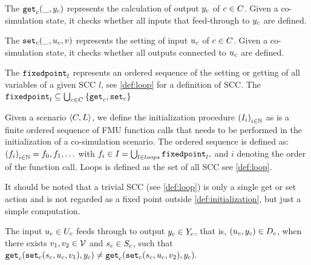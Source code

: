 \begin{definition}\label{def:getout}
The $\mathtt{get}_{c}(\_, y_{c})$ represents the calculation of output $y_{c}$ of $c \in C$. Given a co-simulation state, it checks whether all inputs that feed-through to $y_{c}$ are defined.
\end{definition}

\begin{definition}\label{def:setin}
The $\mathtt{set}_{c}(\_, u_{c}, v)$ represents the setting of input $u_{c}$  of $c \in C$. Given a co-simulation state, it checks whether all outputs connected to $u_{c}$ are defined.
\end{definition}

\begin{definition}\label{def:fixedpoint}
The $\mathtt{fixedpoint}_{l}$ represents an ordered sequence of the setting or getting of all variables of a given SCC $l$, see \cref{def:loop} for a definition of SCC.
The $\mathtt{fixedpoint}_{l} \subseteq \bigcup_{c \in C}  \left\{ \mathtt{get}_{c},\mathtt{set}_{c} \right\}$ 
\end{definition}


\begin{definition}[Initialization]\label{def:initialization}
  Given a scenario $ \left\langle C, L \right\rangle $, we define the initialization procedure $ \left( I_i \right)_{i \in \mathbb{N}}$ as is a finite ordered sequence of FMU function calls that needs to be performed in the initialization of a co-simulation scenario. The ordered sequence is defined as: $ \left( f_i \right)_{i \in \mathbb{N}} = f_0, f_1, \ldots$ with
  $f_i \in I_{} = \bigcup_{l \in loops} \mathtt{fixedpoint}_{l},$
  and $i$ denoting the order of the function call.
  Loops is defined as the set of all SCC see \cref{def:loop}.
\end{definition}

It should be noted that a trivial SCC (see \cref{def:loop}) is only a single get or set action and is not regarded as a fixed point outside \cref{def:initialization}, but just a simple computation.

\begin{definition}\label{def:feedthrough}
  The input $u_{c} \in U_{c}$ feeds through to output $y_{c} \in Y_{c}$, that is, $(u_{c},y_{c}) \in D_{c}$, when there exists $v_1, v_2 \in \mathcal{V}$ and $s_{c} \in S_{c}$, such that
  $
  \mathtt{get}_{c} (\mathtt{set}_{c}(s_{c}, u_{c}, v_1), y_{c}) \neq \mathtt{get}_{c} (\mathtt{set}_{c}(s_{c}, u_{c}, v_2), y_{c}).
  $
\end{definition}

